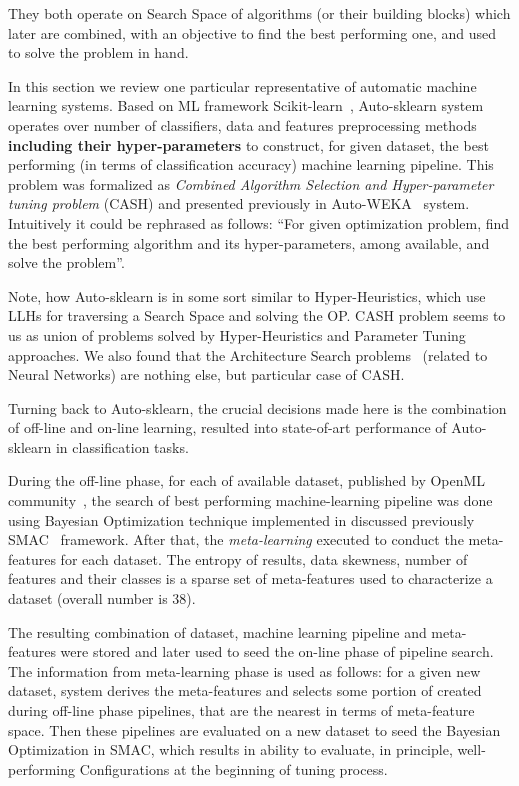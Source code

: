 They both operate on Search Space of algorithms (or their building blocks) which later are combined, with an objective to find the best performing one, and used to solve the problem in hand. 

In this section we review one particular representative of automatic machine learning systems.
Based on ML framework Scikit-learn~\cite{scikit-learn}, Auto-sklearn system~\cite{feurer2015efficient} operates over number of classifiers, data and features preprocessing methods \textbf{including their hyper-parameters} to construct, for given dataset, the best performing (in terms of classification accuracy) machine learning pipeline.
This problem was formalized as \textit{Combined Algorithm Selection and Hyper-parameter tuning problem} (CASH) and presented previously in Auto-WEKA~\cite{thornton2013auto} system. Intuitively it could be rephrased as follows: ``For given optimization problem, find the best performing algorithm and its hyper-parameters, among available, and solve the problem''. 

Note, how Auto-sklearn is in some sort similar to Hyper-Heuristics, which use LLHs for traversing a Search Space and solving the OP. 
CASH problem seems to us as union of problems solved by Hyper-Heuristics and Parameter Tuning approaches. We also found that the Architecture Search problems~\cite{elsken2018neural} (related to Neural Networks) are nothing else, but particular case of CASH.


Turning back to Auto-sklearn, the crucial decisions made here is the combination of off-line and on-line learning, resulted into state-of-art performance of Auto-sklearn in classification tasks.

During the off-line phase, for each of available dataset, published by OpenML community~\cite{OpenMLPython2019}, the search of best performing machine-learning pipeline was done using Bayesian Optimization technique implemented in discussed previously SMAC~\cite{hutter2011sequential} framework.
After that, the \textit{meta-learning} executed to conduct the meta-features for each dataset. The entropy of results, data skewness, number of features and their classes is a sparse set of meta-features used to characterize a dataset (overall number is 38).

The resulting combination of dataset, machine learning pipeline and meta-features were stored and later used to seed the on-line phase of pipeline search.
The information from meta-learning phase is used as follows: for a given new dataset, system derives the meta-features and selects some portion of created during off-line phase pipelines, that are the nearest in terms of meta-feature space. Then these pipelines are evaluated on a new dataset to seed the Bayesian Optimization in SMAC, which results in ability to evaluate, in principle, well-performing Configurations at the beginning of tuning process.

